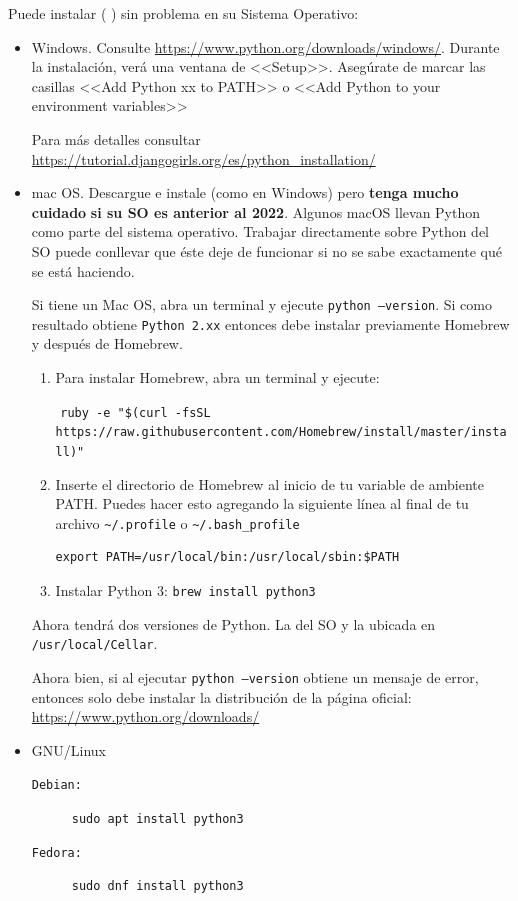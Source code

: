 Puede instalar  ( ) sin problema en su Sistema Operativo:

	\begin{itemize}
	\item 
	Windows. Consulte \url{https://www.python.org/downloads/windows/}. Durante la instalación, verá una ventana de <<Setup>>. Asegúrate de marcar las casillas <<Add Python xx to PATH>> o <<Add Python to your environment variables>>

Para más detalles consultar \- \url{https://tutorial.djangogirls.org/es/python_installation/}
	
	\item 
	mac OS.   Descargue e instale (como en Windows) pero \textbf{tenga mucho cuidado} \textbf{si su SO es anterior al 2022}. Algunos macOS llevan Python como parte del sistema operativo. Trabajar directamente sobre Python del SO puede conllevar que éste deje de funcionar si no se sabe exactamente qué se está haciendo. 
	
	Si tiene un Mac OS, abra un terminal y ejecute \texttt{python --version}. Si como resultado obtiene \texttt{Python 2.xx} entonces debe instalar previamente Homebrew y después  de Homebrew.
		\begin{enumerate}
		\item Para instalar Homebrew, abra un terminal y ejecute:
		
		$ $ \hbox{\small \texttt{ruby -e "}\verb+$+\texttt{(curl -fsSL https://raw.githubusercontent.com/Homebrew/install/master/install)"}}
		
		\item Inserte el directorio de Homebrew al inicio de tu variable de ambiente PATH. Puedes hacer esto agregando la siguiente línea al final de tu archivo \verb+~/.profile+ o \verb+~/.bash_profile+
\begin{verbatim}
export PATH=/usr/local/bin:/usr/local/sbin:$PATH
\end{verbatim}


		\item Instalar Python 3: \texttt{brew install python3}
		\end{enumerate}
		
		Ahora tendrá dos versiones de Python. La del SO y la ubicada en \texttt{/usr/local/Cellar}.
		
		Ahora bien, si al ejecutar \texttt{python --version} \/ obtiene un mensaje de error, entonces solo debe instalar la distribución de la página oficial: \url{https://www.python.org/downloads/}
		
		
%
		
	\item GNU/Linux
		\begin{description}
		\item[\tt Debian:] \verb+sudo apt install python3+
		\item[\tt Fedora:] \verb+sudo dnf install python3+
		\end{description}
	\end{itemize}
	
